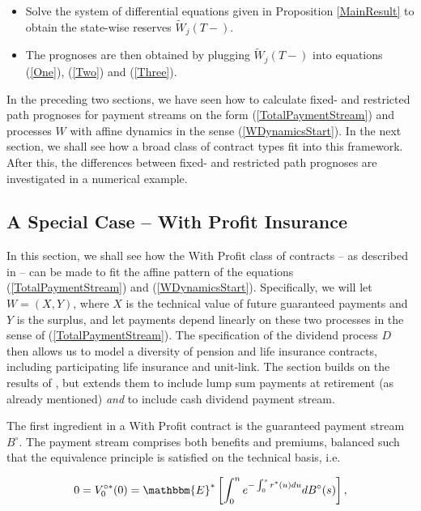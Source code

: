 \documentclass{article}
\newcommand{\1}[1]{\mathbbm{1}_{\left\lbrace #1 \right\rbrace}}
\newcommand{\expecStar}[1][def]{\mathbbm{E}^* \left[ #1 \right]}
\theoremstyle{break}
\theoremstyle{remark}
\numberwithin{equation}{section}
\begin{document}
\begin{itemize}
	\item Solve the system of differential equations given in Proposition \ref{MainResult} to obtain the state-wise reserves $\tilde{W}_j(T-)$.
	\item The prognoses are then obtained by plugging $\tilde{W}_j(T-)$ into equations (\ref{One}), (\ref{Two}) and (\ref{Three}).
\end{itemize}



In the preceding two sections, we have seen how to calculate fixed- and restricted path prognoses for payment streams on the form (\ref{TotalPaymentStream}) and processes $W$ with affine dynamics in the sense (\ref{WDynamicsStart}). In the next section, we shall see how a broad class of contract types fit into this framework. After this, the differences between fixed- and restricted path prognoses are investigated in a numerical example.

\newpage
\subsection{A Special Case -- With Profit Insurance} \label{WithProfit}

In this section, we shall see how the With Profit class of contracts -- as described in \cite{Liv2Bog} -- can be made to fit the affine pattern of the equations (\ref{TotalPaymentStream}) and (\ref{WDynamicsStart}). Specifically, we will let $W=(X,Y)$, where $X$ is the technical value of future guaranteed payments and $Y$ is the surplus, and let payments depend linearly on these two processes in the sense of (\ref{TotalPaymentStream}). The specification of the dividend process $D$ then allows us to model a diversity of pension and life insurance contracts, including participating life insurance and unit-link. The section builds on the results of \cite{Lollike}, but extends them to include lump sum payments at retirement (as already mentioned) \textit{and} to include cash dividend payment stream.

The first ingredient in a With Profit contract is the guaranteed payment stream $B^\circ$. The payment stream comprises both benefits and premiums, balanced such that the equivalence principle is satisfied on the technical basis, i.e.

\begin{align*}
0 = V_0^{\circ*}(0) = \expecStar[\int_0^n e^{-\int_0^s r^*(u) du} dB^\circ(s)],
\end{align*}
\end{document}
